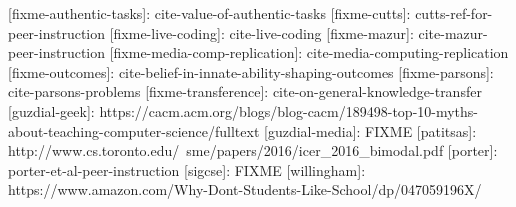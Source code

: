 \documentclass{article}
\begin{document}
[fixme-authentic-tasks]: cite-value-of-authentic-tasks
[fixme-cutts]: cutts-ref-for-peer-instruction
[fixme-live-coding]: cite-live-coding
[fixme-mazur]: cite-mazur-peer-instruction
[fixme-media-comp-replication]: cite-media-computing-replication
[fixme-outcomes]: cite-belief-in-innate-ability-shaping-outcomes
[fixme-parsons]: cite-parsons-problems
[fixme-transference]: cite-on-general-knowledge-transfer
[guzdial-geek]: https://cacm.acm.org/blogs/blog-cacm/189498-top-10-myths-about-teaching-computer-science/fulltext
[guzdial-media]: FIXME
[patitsas]: http://www.cs.toronto.edu/~sme/papers/2016/icer\_2016\_bimodal.pdf
[porter]: porter-et-al-peer-instruction
[sigcse]: FIXME
[willingham]: https://www.amazon.com/Why-Dont-Students-Like-School/dp/047059196X/
\end{document}
